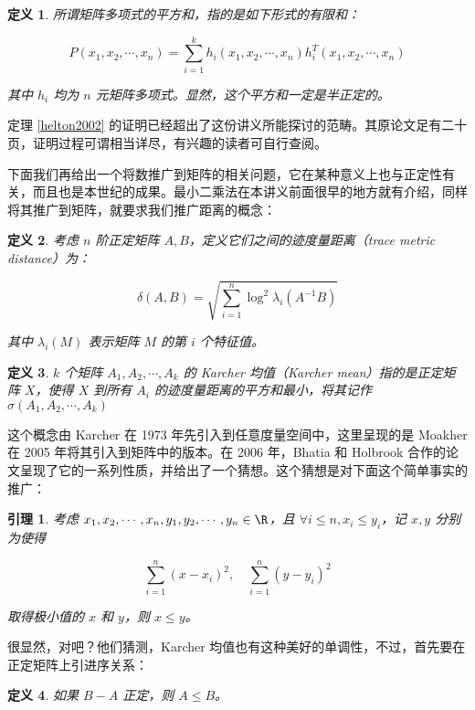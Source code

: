 \documentclass{ctexbook}
\newtheorem{definition}{定义}[chapter] %
\newtheorem{lemma}{引理}[chapter]
\begin{document}
\begin{definition}
    所谓矩阵多项式的平方和，指的是如下形式的有限和：

    \[
    P(x_1, x_2, \cdots, x_n) = \sum_{i = 1}^k h_i(x_1, x_2, \cdots, x_n)h_i^T(x_1, x_2, \cdots, x_n)
    \]

    其中 $h_i$ 均为 $n$ 元矩阵多项式。显然，这个平方和一定是半正定的。
\end{definition}

定理 \ref{helton2002} 的证明已经超出了这份讲义所能探讨的范畴。其原论文足有二十页，证明过程可谓相当详尽，有兴趣的读者可自行查阅。

下面我们再给出一个将数推广到矩阵的相关问题，它在某种意义上也与正定性有关，而且也是本世纪的成果。最小二乘法在本讲义前面很早的地方就有介绍，同样将其推广到矩阵，就要求我们推广距离的概念：

\begin{definition}
    考虑 $n$ 阶正定矩阵 $A, B$，定义它们之间的迹度量距离（trace metric distance）为：

    \[
    \delta(A, B) = \sqrt{\sum_{i = 1}^n \log^2\lambda_i(A^{-1}B)}
    \]

    其中 $\lambda_i(M)$ 表示矩阵 $M$ 的第 $i$ 个特征值。
\end{definition}

\begin{definition}
    $k$ 个矩阵 $A_1, A_2, \cdots, A_k$ 的 Karcher 均值（Karcher mean）指的是正定矩阵 $X$，使得 $X$ 到所有 $A_i$ 的迹度量距离的平方和最小，将其记作 $\sigma(A_1, A_2, \cdots, A_k)$
\end{definition}

这个概念由 Karcher 在 1973 年先引入到任意度量空间中，这里呈现的是 Moakher 在 2005 年将其引入到矩阵中的版本。在 2006 年，Bhatia 和 Holbrook 合作的论文呈现了它的一系列性质，并给出了一个猜想。这个猜想是对下面这个简单事实的推广：

\begin{lemma}
考虑 $x_1, x_2, \cdots, x_n, y_1, y_2, \cdots, y_n \in \R$，且 $\forall i \leqslant n, x_i \leqslant y_i$，记 $x, y$ 分别为使得

\[
\sum_{i = 1}^n (x - x_i)^2, \quad \sum_{i = 1}^n (y - y_i)^2
\]

取得极小值的 $x$ 和 $y$，则 $x \leqslant y$。
\end{lemma}

很显然，对吧？他们猜测，Karcher 均值也有这种美好的单调性，不过，首先要在正定矩阵上引进序关系：

\begin{definition}
    如果 $B - A$ 正定，则 $A \leqslant B$。
\end{definition}
\end{document}
